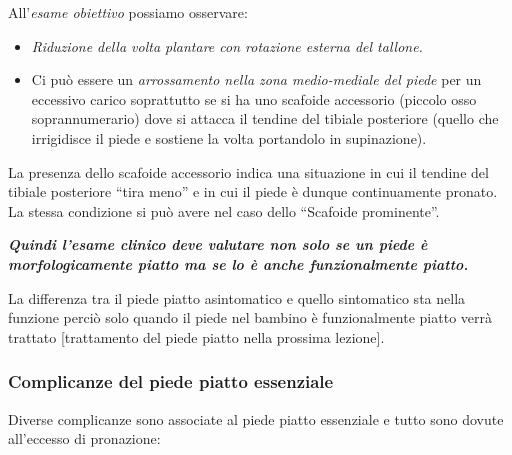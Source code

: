 All'\emph{esame obiettivo} possiamo osservare:

\begin{itemize}
\item
  \emph{Riduzione della volta plantare con rotazione esterna del tallone.}
\item
  Ci può essere un \emph{arrossamento nella zona medio-mediale del piede} per un eccessivo carico soprattutto se si ha uno scafoide accessorio (piccolo osso soprannumerario) dove si attacca il tendine del tibiale posteriore (quello che irrigidisce il piede e sostiene la volta portandolo in supinazione).
\end{itemize}

La presenza dello scafoide accessorio indica una situazione in cui il tendine del tibiale posteriore ``tira meno'' e in cui il piede è dunque continuamente pronato. La stessa condizione si può avere nel caso dello ``Scafoide prominente''.

\textbf{\emph{Quindi l'esame clinico deve valutare non solo se un piede è morfologicamente piatto ma se lo è anche funzionalmente piatto.}}

La differenza tra il piede piatto asintomatico e quello sintomatico sta nella funzione perciò solo quando il piede nel bambino è funzionalmente piatto verrà trattato {[}trattamento del piede piatto nella prossima lezione{]}.

\subsubsection{Complicanze del piede piatto essenziale}

Diverse complicanze sono associate al piede piatto essenziale e tutto sono dovute all'eccesso di pronazione:

